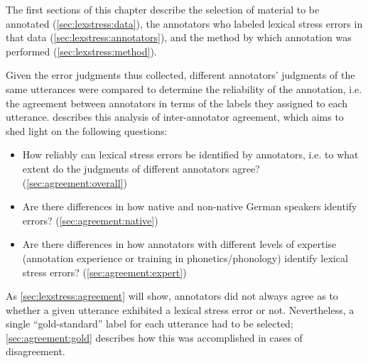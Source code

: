 	
	The first sections of this chapter describe the selection of material to be annotated (\cref{sec:lexstress:data}), the annotators who labeled lexical stress errors in that data (\cref{sec:lexstress:annotators}), and the method by which annotation was performed (\cref{sec:lexstress:method}). 
	
	Given the error judgments thus collected, 
	different annotators' judgments of the same utterances were compared to determine the reliability of the annotation, i.e. the agreement between annotators in terms of the labels they assigned to each utterance.
	 describes this analysis of inter-annotator agreement, which aims to shed light on the following questions:
	\begin{itemize}[topsep=-1em]
	\item{How reliably can lexical stress errors be identified by
	annotators, i.e. to what extent do the judgments of different annotators agree?  (\cref{sec:agreement:overall})}
	\item{Are there differences in how native and non-native German speakers identify errors?  (\cref{sec:agreement:native})}
	\item{Are there differences in how 
	annotators with different levels of expertise
	(annotation experience or training in phonetics/phonology) identify lexical stress errors?  (\cref{sec:agreement:expert})} 
	\end{itemize}
	As \cref{sec:lexstress:agreement} will show, annotators did not always agree as to whether a given utterance exhibited a lexical stress error or not. Nevertheless, a single ``gold-standard'' label for each utterance had to be selected; \cref{sec:agreement:gold} describes how this was accomplished in cases of disagreement.
	
